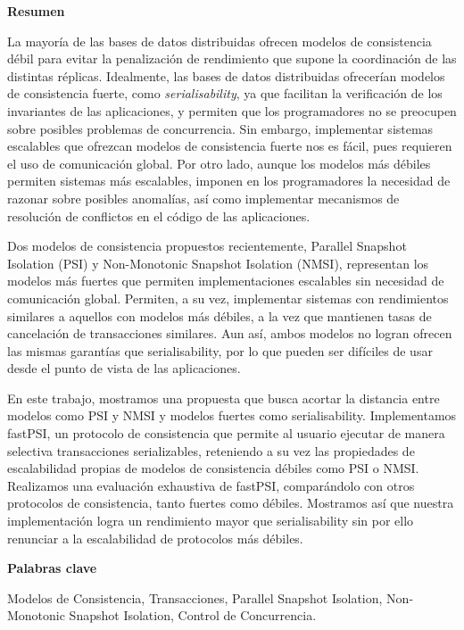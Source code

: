 \newpage

\begin{center}
{\bf \Huge Resumen}
\end{center}

\vspace{1cm}

La mayoría de las bases de datos distribuidas ofrecen modelos de consistencia
débil para evitar la penalización de rendimiento que supone la coordinación de
las distintas réplicas. Idealmente, las bases de datos distribuidas ofrecerían
modelos de consistencia fuerte, como \emph{serialisability}, ya que facilitan la
verificación de los invariantes de las aplicaciones, y permiten que los
programadores no se preocupen sobre posibles problemas de concurrencia. Sin
embargo, implementar sistemas escalables que ofrezcan modelos de consistencia
fuerte nos es fácil, pues requieren el uso de comunicación global. Por otro lado,
aunque los modelos más débiles permiten sistemas más escalables, imponen en los
programadores la necesidad de razonar sobre posibles anomalías, así como
implementar mecanismos de resolución de conflictos en el código de las aplicaciones.

Dos modelos de consistencia propuestos recientemente, Parallel Snapshot Isolation
(PSI) y Non-Monotonic Snapshot Isolation (NMSI), representan los modelos más
fuertes que permiten implementaciones escalables sin necesidad de comunicación
global. Permiten, a su vez, implementar sistemas con rendimientos similares a
aquellos con modelos más débiles, a la vez que mantienen tasas de cancelación de
transacciones similares. Aun así, ambos modelos no logran ofrecen las mismas
garantías que serialisability, por lo que pueden ser difíciles de usar desde el
punto de vista de las aplicaciones.

En este trabajo, mostramos una propuesta que busca acortar la distancia entre
modelos como PSI y NMSI y modelos fuertes como serialisability. Implementamos
fastPSI, un protocolo de consistencia que permite al usuario ejecutar de manera
selectiva transacciones serializables, reteniendo a su vez las propiedades de
escalabilidad propias de modelos de consistencia débiles como PSI o NMSI.
Realizamos una evaluación exhaustiva de fastPSI, comparándolo con otros protocolos
de consistencia, tanto fuertes como débiles. Mostramos así que nuestra
implementación logra un rendimiento mayor que serialisability sin por ello
renunciar a la escalabilidad de protocolos más débiles.

\vspace{1cm}

\begin{center}
{\bf \Large Palabras clave}
\end{center}

\vspace{0.5cm}

Modelos de Consistencia, Transacciones, Parallel Snapshot Isolation,
Non-Monotonic Snapshot Isolation, Control de Concurrencia.
